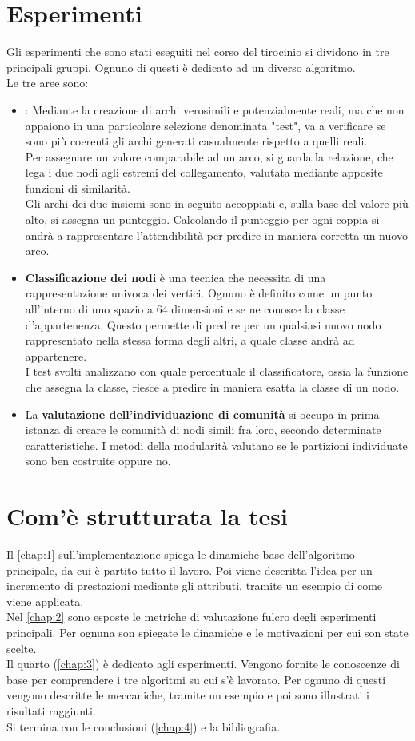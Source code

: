 \section{Esperimenti}
Gli esperimenti che sono stati eseguiti nel corso del tirocinio si dividono in tre principali gruppi. Ognuno di questi è dedicato ad un diverso algoritmo.\\
Le tre aree sono:
\begin{itemize}
	\item \textbf{\LPred}: Mediante la creazione di archi verosimili e potenzialmente reali, ma che non appaiono in una particolare selezione denominata "test", va a verificare se sono più coerenti gli archi generati casualmente rispetto a quelli reali.\\
	Per assegnare un valore comparabile ad un arco, si guarda la relazione, che lega i due nodi agli estremi del collegamento, valutata mediante apposite funzioni di similarità.\\
	Gli archi dei due insiemi sono in seguito accoppiati e, sulla base del valore più alto, si assegna un punteggio. Calcolando il punteggio per ogni coppia si andrà a rappresentare l'attendibilità per predire in maniera corretta un nuovo arco.
	\item \textbf{Classificazione dei nodi} è una tecnica che necessita di una rappresentazione univoca dei vertici. Ognuno è definito come un punto all'interno di uno spazio a $64$ dimensioni e se ne conosce la classe d'appartenenza. Questo permette di predire per un qualsiasi nuovo nodo rappresentato nella stessa forma degli altri, a quale classe andrà ad appartenere.\\
	I test svolti analizzano con quale percentuale il classificatore, ossia la funzione che assegna la classe, riesce a predire in maniera esatta la classe di un nodo.
	\item La \textbf{valutazione dell'individuazione di comunità} si occupa in prima istanza di creare le comunità di nodi simili fra loro, secondo determinate caratteristiche. I metodi della modularità valutano se le partizioni individuate sono ben costruite oppure no.
\end{itemize}
%
\section{Com'è strutturata la tesi}
Il \autoref{chap:1} sull'implementazione spiega le dinamiche base dell'algoritmo principale, da cui è partito tutto il lavoro. Poi viene descritta l'idea per un incremento di prestazioni mediante gli attributi, tramite un esempio di come viene applicata.\\
Nel \autoref{chap:2} sono esposte le metriche di valutazione fulcro degli esperimenti principali. Per ognuna son spiegate le dinamiche e le motivazioni per cui son state scelte.\\
Il quarto (\autoref{chap:3}) è dedicato agli esperimenti. Vengono fornite le conoscenze di base per comprendere i tre algoritmi su cui s'è lavorato. Per ognuno di questi vengono descritte le meccaniche, tramite un esempio e poi sono illustrati i risultati raggiunti.\\
Si termina con le conclusioni (\autoref{chap:4}) e la bibliografia.
%

\newpage
%



